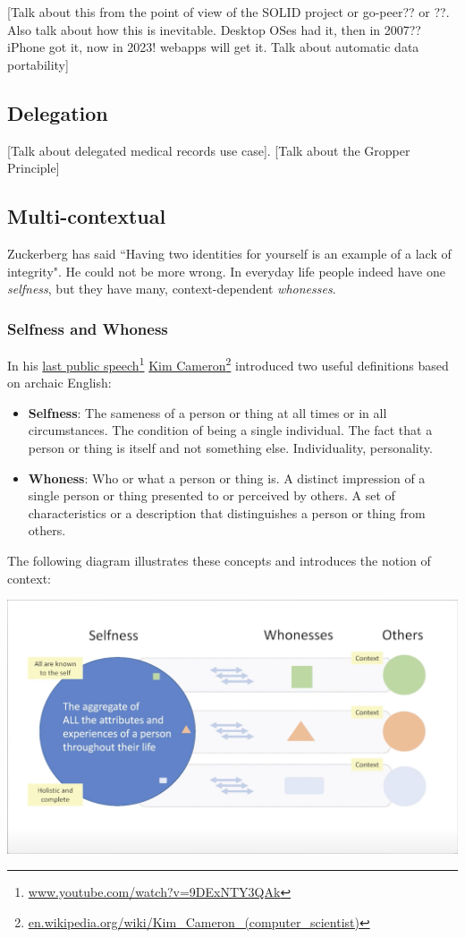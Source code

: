 \documentclass[11pt, oneside]{article}   	%
\newcommand{\hyperfootnote}[1][]{\def\ArgI{{#1}}\hyperfootnoteRelay}
\newcommand\hyperfootnoteRelay[2][]{\href{#1#2}{\ArgI}\footnote{\href{#1#2}{#2}}}
\begin{document}
[Talk about this from the point of view of the SOLID project or go-peer?? or ??. Also talk about how this is inevitable. Desktop OSes had it, then in 2007?? iPhone got it, now in 2023! webapps will get it. Talk about automatic data portability]

\subsection{Delegation}

[Talk about delegated medical records use case]. [Talk about the Gropper Principle]

\subsection{Multi-contextual}

Zuckerberg has said ``Having two identities for yourself is an example of a lack of integrity"\cite{Kirkpatrick2011}. He could not be more wrong. In everyday life people indeed have one \emph{selfness}, but they have many, context-dependent \emph{whonesses}.

\subsubsection{Selfness and Whoness}

In his \hyperfootnote[last public speech][https://]{www.youtube.com/watch?v=9DExNTY3QAk}  
\hyperfootnote[Kim Cameron][https://]{en.wikipedia.org/wiki/Kim\_Cameron\_(computer\_scientist)} introduced two useful definitions based on archaic English:

\begin{itemize}
\item \textbf{Selfness}: The sameness of a person or thing at all times or in all circumstances. The condition of being a single individual. The fact that a person or thing is itself and not something else. Individuality, personality. 
\item \textbf{Whoness}: Who or what a person or thing is. A distinct impression of a single person or thing presented to or perceived by others. A set of characteristics or a description that distinguishes a person or thing from others. 
\end{itemize}

The following diagram illustrates these concepts and introduces the notion of context:

\includegraphics[width=\textwidth]{./images/selfness-and-whoness-larger.png}
\end{document}
